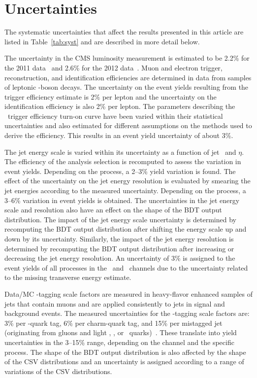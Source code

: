 \documentclass[11pt,twoside,a4paper,cmspaper,final,collab]{cms-tdr}
\begin{document}
\section{Uncertainties}\label{sec:hbb_Uncertainties}

The systematic uncertainties that affect the results presented in this
article are listed in
Table~\ref{tab:syst} and are described in more detail below.

The uncertainty in the CMS luminosity measurement is estimated to be 2.2\%
for the 2011 data~\cite{CMS-PAS-SMP-12-008} and 2.6\% for the 2012 data~\cite{CMS-PAS-LUM-12-001}.
Muon and electron trigger,
reconstruction, and identification efficiencies are
determined in data from samples of
leptonic \cPZ-boson decays. The uncertainty on the event yields resulting
from the trigger efficiency estimate is
2\% per lepton and the uncertainty on the
identification efficiency is also 2\% per lepton. The parameters describing the
\ZnnH\ trigger efficiency turn-on curve have been
varied within their statistical uncertainties and also estimated for different
assumptions on the methods used to derive the efficiency.  This
results in an event yield
uncertainty of about 3\%.

The jet energy scale is
varied within its uncertainty as a function of jet \pt\ and
$\eta$. The efficiency of the analysis selection is
recomputed to assess the variation in event yields.  Depending on the
process, a 2--3\%
yield variation is found. The effect of the uncertainty
on the jet energy resolution is evaluated by
smearing the jet energies according to the measured
uncertainty. Depending on the process, a 3--6\% variation in event yields is
obtained. The uncertainties in the jet energy scale and
resolution also have an effect on the shape of the BDT
output distribution. The impact of the jet energy scale uncertainty is determined by recomputing
the BDT output distribution after shifting the energy scale up and down by its
uncertainty.   Similarly, the impact of the jet energy resolution is
determined by recomputing the BDT output distribution after increasing or decreasing the jet energy resolution. An uncertainty of 3\% is assigned to
the event yields of all processes in the \WlnH\ and \ZnnH\ channels due to the
uncertainty related to the missing transverse energy estimate.


Data/MC \cPqb-tagging scale factors are measured in heavy-flavor
enhanced samples of jets that contain muons and
are applied  consistently to jets in signal and background
events. The measured uncertainties for the \cPqb-tagging scale factors are:
3\% per \cPqb-quark tag, 6\% per charm-quark tag, and 15\% per
mistagged jet (originating from gluons and light \cPqu, \cPqd, or \cPqs\ quarks)~\cite{Chatrchyan:2012jua}. These translate into yield uncertainties in the 3--15\%
range, depending on the channel and the specific process. The
shape of the BDT output distribution is also affected by the shape of
the CSV distributions and an uncertainty is assigned according to a range of variations of the CSV distributions.
\end{document}
